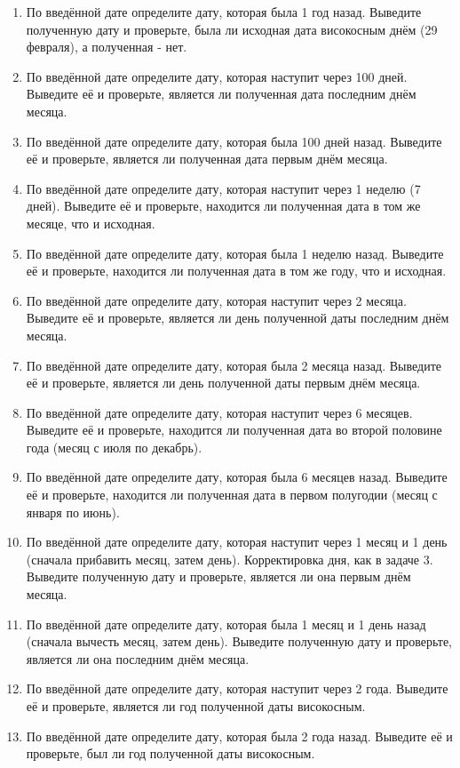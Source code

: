 \documentclass[12pt]{article}
\begin{document}
\begin{enumerate}
    \item По введённой дате определите дату, которая была 1 год назад. Выведите полученную дату и проверьте, была ли исходная дата високосным днём (29 февраля), а полученная - нет.
    \item По введённой дате определите дату, которая наступит через 100 дней. Выведите её и проверьте, является ли полученная дата последним днём месяца.
    \item По введённой дате определите дату, которая была 100 дней назад. Выведите её и проверьте, является ли полученная дата первым днём месяца.
    \item По введённой дате определите дату, которая наступит через 1 неделю (7 дней). Выведите её и проверьте, находится ли полученная дата в том же месяце, что и исходная.
    \item По введённой дате определите дату, которая была 1 неделю назад. Выведите её и проверьте, находится ли полученная дата в том же году, что и исходная.
    \item По введённой дате определите дату, которая наступит через 2 месяца. Выведите её и проверьте, является ли день полученной даты последним днём месяца.
    \item По введённой дате определите дату, которая была 2 месяца назад. Выведите её и проверьте, является ли день полученной даты первым днём месяца.
    \item По введённой дате определите дату, которая наступит через 6 месяцев. Выведите её и проверьте, находится ли полученная дата во второй половине года (месяц с июля по декабрь).
    \item По введённой дате определите дату, которая была 6 месяцев назад. Выведите её и проверьте, находится ли полученная дата в первом полугодии (месяц с января по июнь).
    \item По введённой дате определите дату, которая наступит через 1 месяц и 1 день (сначала прибавить месяц, затем день). Корректировка дня, как в задаче 3. Выведите полученную дату и проверьте, является ли она первым днём месяца.
    \item По введённой дате определите дату, которая была 1 месяц и 1 день назад (сначала вычесть месяц, затем день). Выведите полученную дату и проверьте, является ли она последним днём месяца.
    \item По введённой дате определите дату, которая наступит через 2 года. Выведите её и проверьте, является ли год полученной даты високосным.
    \item По введённой дате определите дату, которая была 2 года назад. Выведите её и проверьте, был ли год полученной даты високосным.

\end{enumerate}
\end{document}
